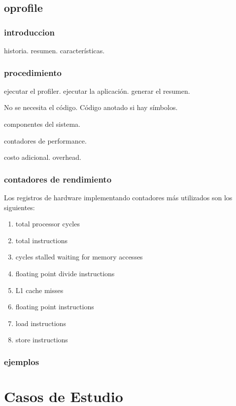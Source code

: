 \documentclass[a4paper]{report}
\begin{document}
\section{oprofile}

\subsection{introduccion}

historia. resumen. caracter\'isticas. 

\subsection{procedimiento}

ejecutar el profiler. ejecutar la aplicaci\'on. generar el resumen.

No se necesita el c\'odigo. C\'odigo anotado si hay s\'imbolos.

componentes del sistema.

contadores de performance.

costo adicional. overhead.

\subsection{contadores de rendimiento}

Los registros de hardware implementando contadores m\'as utilizados son los siguientes:

\begin{enumerate}
\item total processor cycles
\item total instructions
\item cycles stalled waiting for memory accesses
\item floating point divide instructions
\item L1 cache misses
\item floating point instructions
\item load instructions
\item store instructions
\end{enumerate}

\subsection{ejemplos}

\chapter{Casos de Estudio}
\end{document}
